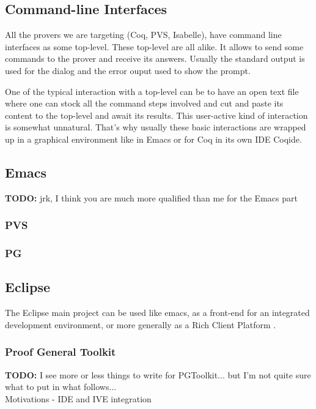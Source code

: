 \documentclass{entcs}
\newcommand{\todo}{\textbf{TODO: }}
\begin{document}
\subsection{Command-line Interfaces}
All the provers we are targeting (Coq, PVS, Isabelle), have command line interfaces as 
some top-level. These top-level are all alike. It allows to send some commands
to the prover and receive its answers. Usually the standard output is
used for the dialog and the error ouput used to show the prompt.

One of the typical interaction with a top-level can be to have an open text file
where one can stock all the command steps involved and cut and paste its 
content to the top-level and await its results. This user-active kind of 
interaction is somewhat unnatural. That's why usually these basic interactions
are wrapped up in a graphical environment like in Emacs or for Coq
in its own IDE Coqide.



\subsection{Emacs}
\todo{jrk, I think you are much more qualified than me for the Emacs part}
\subsubsection{PVS }
\subsubsection{PG}
\subsection{Eclipse}
The Eclipse main project can be used like emacs, as a front-end 
for an integrated development environment, or more generally as
a Rich Client Platform \cite{eclipse-rcp}. 
\subsubsection{Proof General Toolkit}
\todo{I see more or less things to write for PGToolkit... but I'm not quite
sure what to put in what follows...}\\
Motivations - IDE and IVE integration
\end{document}
